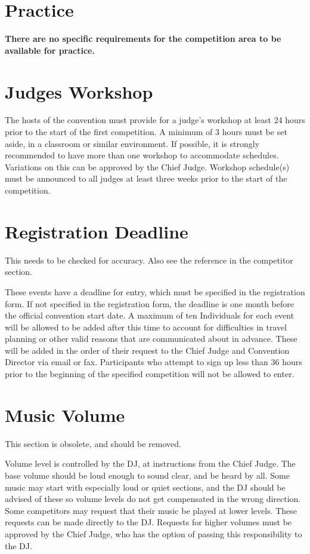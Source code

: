 \section{Practice}

\textbf{There are no specific requirements for the competition area to be available for practice.}

\section{Judges Workshop}
The hosts of the convention must provide for a judge's workshop at least 24 hours prior to the start of the first competition.
A minimum of 3 hours must be set aside, in a classroom or similar environment.
If possible, it is strongly recommended to have more than one workshop to accommodate schedules.
Variations on this can be approved by the Chief Judge.
Workshop schedule(s) must be announced to all judges at least three weeks prior to the start of the competition.

\section{Registration Deadline}

\begin{framed}
This needs to be checked for accuracy.
Also see the reference in the competitor section.
\end{framed}

These events have a deadline for entry, which must be specified in the registration form.
If not specified in the registration form, the deadline is one month before the official convention start date.
A maximum of ten Individuals for each event will be allowed to be added after this time to account for difficulties in travel planning or other valid reasons that are communicated about in advance.
These will be added in the order of their request to the Chief Judge and Convention Director via email or fax.
Participants who attempt to sign up less than 36 hours prior to the beginning of the specified competition will not be allowed to enter.

\section{Music Volume}

\begin{framed}
This section is obsolete, and should be removed.
\end{framed}

Volume level is controlled by the DJ, at instructions from the Chief Judge.
The base volume should be loud enough to sound clear, and be heard by all.
Some music may start with especially loud or quiet sections, and the DJ should be advised of these so volume levels do not get compensated in the wrong direction.
Some competitors may request that their music be played at lower levels.
These requests can be made directly to the DJ.
Requests for higher volumes must be approved by the Chief Judge, who has the option of passing this responsibility to the DJ.
